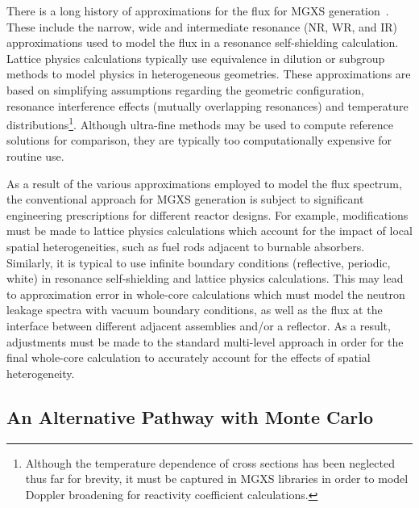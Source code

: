 
There is a long history of approximations for the flux for \ac{MGXS} generation~\cite{cacuci2010handbook}. These include the narrow, wide and intermediate resonance (NR, WR, and IR) approximations used to model the flux in a resonance self-shielding calculation. Lattice physics calculations typically use equivalence in dilution or subgroup methods to model physics in heterogeneous geometries. These approximations are based on simplifying assumptions regarding the geometric configuration, resonance interference effects (mutually overlapping resonances) and temperature distributions\footnote{Although the temperature dependence of cross sections has been neglected thus far for brevity, it must be captured in \ac{MGXS} libraries in order to model Doppler broadening for reactivity coefficient calculations.}. Although ultra-fine methods may be used to compute reference solutions for comparison, they are typically too computationally expensive for routine use. 

As a result of the various approximations employed to model the flux spectrum, the conventional approach for \ac{MGXS} generation is subject to significant engineering prescriptions for different reactor designs.  For example, modifications must be made to lattice physics calculations which account for the impact of local spatial heterogeneities, such as fuel rods adjacent to burnable absorbers. Similarly, it is typical to use infinite boundary conditions (reflective, periodic, white) in resonance self-shielding and lattice physics calculations. This may lead to approximation error in whole-core calculations which must model the neutron leakage spectra with vacuum boundary conditions, as well as the flux at the interface between different adjacent assemblies and/or a reflector. As a result, adjustments must be made to the standard multi-level approach in order for the final whole-core calculation to accurately account for the effects of spatial heterogeneity.


\subsection{An Alternative Pathway with Monte Carlo}
\label{subsec:chap2-mgxs-lib-mc}

